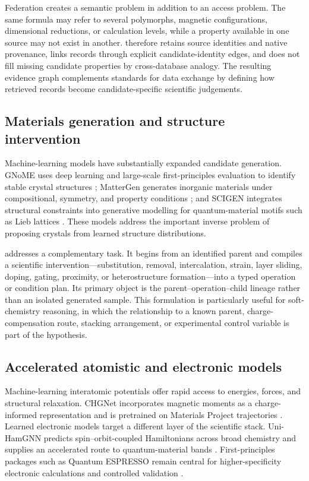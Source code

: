 Federation creates a semantic problem in addition to an access problem.  The same formula may refer to several polymorphs, magnetic configurations, dimensional reductions, or calculation levels, while a property available in one source may not exist in another.  \matevidence therefore retains source identities and native provenance, links records through explicit candidate-identity edges, and does not fill missing candidate properties by cross-database analogy.  The resulting evidence graph complements standards for data exchange by defining how retrieved records become candidate-specific scientific judgements.

\subsection{Materials generation and structure intervention}

Machine-learning models have substantially expanded candidate generation.  GNoME uses deep learning and large-scale first-principles evaluation to identify stable crystal structures \cite{merchant2023gnome}; MatterGen generates inorganic materials under compositional, symmetry, and property conditions \cite{zeni2025mattergen}; and SCIGEN integrates structural constraints into generative modelling for quantum-material motifs such as Lieb lattices \cite{okabe2026scigen}.  These models address the important inverse problem of proposing crystals from learned structure distributions.

\mattransform addresses a complementary task.  It begins from an identified parent and compiles a scientific intervention---substitution, removal, intercalation, strain, layer sliding, doping, gating, proximity, or heterostructure formation---into a typed operation or condition plan.  Its primary object is the parent--operation--child lineage rather than an isolated generated sample.  This formulation is particularly useful for soft-chemistry reasoning, in which the relationship to a known parent, charge-compensation route, stacking arrangement, or experimental control variable is part of the hypothesis.

\subsection{Accelerated atomistic and electronic models}

Machine-learning interatomic potentials offer rapid access to energies, forces, and structural relaxation.  CHGNet incorporates magnetic moments as a charge-informed representation and is pretrained on Materials Project trajectories \cite{deng2023chgnet}.  Learned electronic models target a different layer of the scientific stack.  Uni-HamGNN predicts spin--orbit-coupled Hamiltonians across broad chemistry and supplies an accelerated route to quantum-material bands \cite{zhong2026uniham}.  First-principles packages such as Quantum ESPRESSO remain central for higher-specificity electronic calculations and controlled validation \cite{giannozzi2017qe}.

